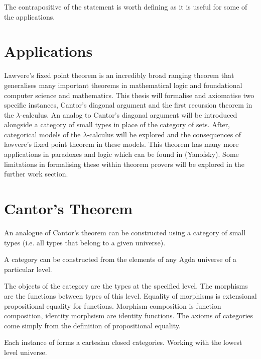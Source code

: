 The contrapositive of the statement is worth defining as it is useful for some
of the applications.

\section{Applications}

Lawvere's fixed point theorem is an incredibly broad ranging theorem that
generalises many important theorems in mathematical logic and foundational
computer science and mathematics. This thesis will formalise and axiomatise two
specific instances, Cantor's diagonal argument and the first recursion theorem
in the $\lambda$-calculus. An analog to Cantor's diagonal argument will be introduced
alongside a category of small types in place of the category of sets.
After, categorical models of the $\lambda$-calculus will be explored and the
consequences of lawvere's fixed point theorem in these models. This theorem has
many more applications in paradoxes and logic which can be found in (Yanofsky).
Some limitations in formalising these within theorem provers will be explored in
the further work section.
\section{Cantor's Theorem}
An analogue of Cantor's theorem can be constructed using a category of small
types (i.e. all types that belong to a given universe).


A category can be constructed from the elements of any Agda universe of a
particular level.


The objects of the category are the types at the specified level. The morphisms
are the functions between types of this level. Equality of morphisms is
extensional propositional equality for functions. Morphism composition is
function composition, identity morphsism are identity functions. The axioms of
categories come simply from the definition of propositional equality.


Each instance of  forms a cartesian closed categories.
Working with the lowest level universe.


